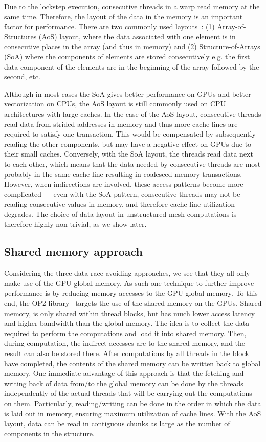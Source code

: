 Due to the lockstep execution, consecutive threads in a warp read  memory at
the same time. Therefore, the layout of the data in the memory is an important
factor for performance. There are two commonly used
layouts~\cite{sharma2015data}: (1) Array-of-Structures (AoS) layout, where the
data associated with one element is in consecutive places in the array (and thus
in memory) and (2) Structure-of-Arrays (SoA) where the components of elements
are stored consecutively e.g. the first data component of the elements are in
the beginning of the array followed by the second, etc.

Although in most cases the SoA gives better performance on GPUs and better
vectorization on CPUs, the AoS layout is still commonly used on CPU
architectures with large caches. In the case of the AoS layout, consecutive
threads read data from strided addresses in memory and thus more cache lines 
are required to satisfy one transaction. This would be compensated by 
subsequently reading the other components, but may have a negative effect on 
 GPUs due to their small caches. Conversely, with the SoA layout, the 
threads read data next to each other, which means that the data needed by 
consecutive threads are most probably in the same cache line resulting in 
coalesced memory transactions. However, when indirections are involved, these
access patterns become more complicated --- even with the SoA pattern,
consecutive threads may not be reading consecutive values in memory, and
therefore cache line utilization degrades. The choice of data layout in
unstructured mesh computations is therefore highly non-trivial, as we show
later.

\subsection{Shared memory approach}\label{shared-memory-approach}

Considering the three data race avoiding approaches, we see that they all only 
make use of the GPU global memory. As such one technique to further improve 
performance is by reducing memory accesses to the GPU global memory. To this 
end, the OP2 library~\cite{op2} targets the use of the shared memory on the 
GPUs. Shared memory, is only shared within thread blocks, but has much lower 
access latency and higher bandwidth than the global memory. The idea is to 
collect the data required to perform the computations and load it into shared 
memory. Then, during computation, the indirect accesses are to the shared
memory, and the result can also be stored there. After computations by all 
threads in the block have completed, the contents of the shared memory can be 
written back to global memory. One immediate advantage of this approach is that 
the fetching and writing back of data from/to the global memory can be done by 
the threads independently of the actual threads that will be carrying out the 
computations on them. Particularly, reading/writing can be done in the order 
in which the data is laid out in memory, ensuring maximum utilization of 
cache lines. With the AoS layout, data can be read in contiguous chunks as 
large as the number of components in the structure.

